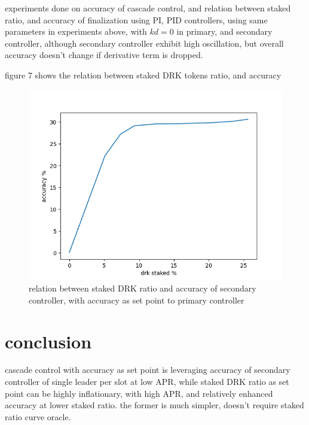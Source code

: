 \documentclass{article}
\begin{document}
\item experiments done on accuracy of cascade control, and relation between staked ratio, and accuracy of finalization using PI, PID controllers, using same parameters in experiments above, with $kd=0$ in primary, and secondary controller, although secondary controller exhibit high oscillation, but overall accuracy doesn't change if derivative term is dropped.

\begin{description}
\item figure 7 shows the relation between staked DRK tokens ratio, and accuracy
\end{description}
\begin{figure}
  \includegraphics{acc_stake_1000nodes_10kslots_with_cascade.png}
  \caption{relation between staked DRK ratio and accuracy of secondary controller, with accuracy as set point to primary controller}
\end{figure}


\section{conclusion}
cascade control with accuracy as set point is leveraging accuracy of secondary controller of single leader per slot at low APR, while staked DRK ratio as set point can be highly inflationary, with high APR, and relatively enhanced accuracy at lower staked ratio. the former is much simpler, doesn't require staked ratio curve oracle.
\end{document}
